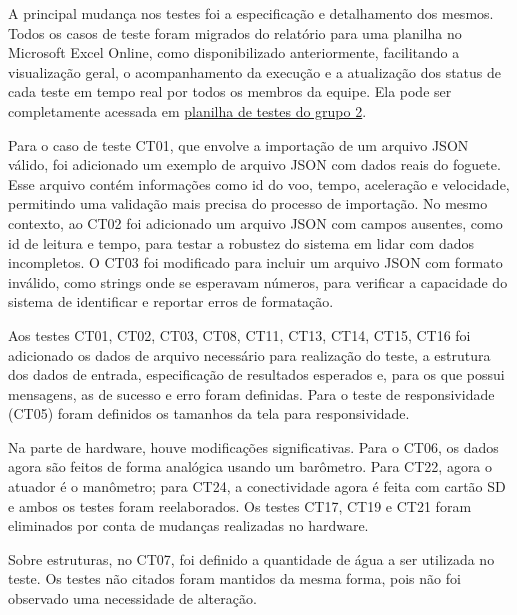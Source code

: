 \begin{samepage}

A principal mudança nos testes foi a especificação e detalhamento dos mesmos. Todos os casos de teste foram migrados do relatório para uma planilha no Microsoft Excel Online, como disponibilizado anteriormente, facilitando a visualização geral, o acompanhamento da execução e a atualização dos status de cada teste em tempo real por todos os membros da equipe. Ela pode ser completamente acessada em
\href{https://unbbr.sharepoint.com/:x:/s/PI1-Grupo2330/EY-ZE1arh2RGgJju4ij_Er4BGhCN5S1qYQiIwdHMMRtLBg?e=fs9Vxi}{planilha de testes do grupo 2}.

Para o caso de teste CT01, que envolve a importação de um arquivo JSON válido, foi adicionado um exemplo de arquivo JSON com dados reais do foguete. Esse arquivo contém informações como id do voo, tempo, aceleração e velocidade, permitindo uma validação mais precisa do processo de importação. No mesmo contexto, ao CT02 foi adicionado um arquivo JSON com campos ausentes, como id de leitura e tempo, para testar a robustez do sistema em lidar com dados incompletos. O CT03 foi modificado para incluir um arquivo JSON com formato inválido, como strings onde se esperavam números, para verificar a capacidade do sistema de identificar e reportar erros de formatação.

Aos testes CT01, CT02, CT03, CT08, CT11, CT13, CT14, CT15, CT16 foi adicionado os dados de arquivo necessário para realização do teste, a estrutura dos dados de entrada, especificação de resultados esperados e, para os que possui mensagens, as de sucesso e erro foram definidas. Para o teste de responsividade (CT05) foram definidos os tamanhos da tela para responsividade. 

Na parte de hardware, houve modificações significativas. Para o CT06, os dados agora são feitos de forma analógica usando um barômetro.  Para CT22, agora o atuador é o manômetro; para CT24, a conectividade agora é feita com cartão SD e ambos os testes foram reelaborados. Os testes CT17, CT19 e CT21 foram eliminados por conta de mudanças realizadas no hardware. 

Sobre estruturas, no CT07, foi definido a quantidade de água a ser utilizada no teste.  Os testes não citados foram mantidos da mesma forma, pois não foi observado uma necessidade de alteração. 


\end{samepage}
% 